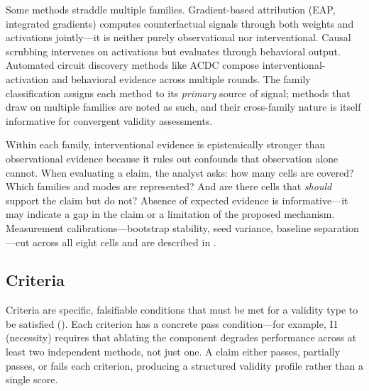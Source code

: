 \documentclass{article}
\begin{document}
Some methods straddle multiple families. Gradient-based attribution (EAP, integrated gradients) computes counterfactual signals through both weights and activations jointly---it is neither purely observational nor interventional. Causal scrubbing intervenes on activations but evaluates through behavioral output. Automated circuit discovery methods like ACDC compose interventional-activation and behavioral evidence across multiple rounds. The family classification assigns each method to its \emph{primary} source of signal; methods that draw on multiple families are noted as such, and their cross-family nature is itself informative for convergent validity assessments.

Within each family, interventional evidence is epistemically stronger than observational evidence because it rules out confounds that observation alone cannot. When evaluating a claim, the analyst asks: how many cells are covered? Which families and modes are represented? And are there cells that \emph{should} support the claim but do not? Absence of expected evidence is informative---it may indicate a gap in the claim or a limitation of the proposed mechanism. Measurement calibrations---bootstrap stability, seed variance, baseline separation---cut across all eight cells and are described in .

\subsection{Criteria}
\label{sec:criteria}

Criteria are specific, falsifiable conditions that must be met for a validity type to be satisfied (). Each criterion has a concrete pass condition---for example, I1 (necessity) requires that ablating the component degrades performance across at least two independent methods, not just one. A claim either passes, partially passes, or fails each criterion, producing a structured validity profile rather than a single score.
\end{document}
